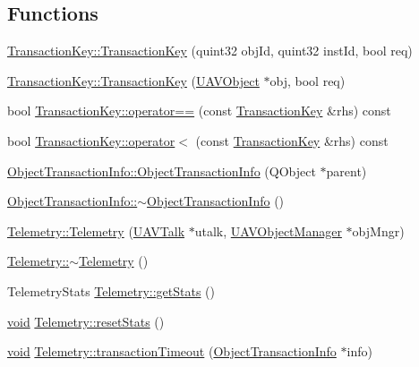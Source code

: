 \subsection*{\-Functions}
\begin{DoxyCompactItemize}
\item 
\hyperlink{group___u_a_v_talk_plugin_gad570ba59a89b2499d1fa950f756f029e}{\-Transaction\-Key\-::\-Transaction\-Key} (quint32 obj\-Id, quint32 inst\-Id, bool req)
\item 
\hyperlink{group___u_a_v_talk_plugin_ga01b3c8039cd97c7da26eb79fdeed0003}{\-Transaction\-Key\-::\-Transaction\-Key} (\hyperlink{class_u_a_v_object}{\-U\-A\-V\-Object} $\ast$obj, bool req)
\item 
bool \hyperlink{group___u_a_v_talk_plugin_ga6619fa90d68b631eef2b94302d77df19}{\-Transaction\-Key\-::operator==} (const \hyperlink{class_transaction_key}{\-Transaction\-Key} \&rhs) const 
\item 
bool \hyperlink{group___u_a_v_talk_plugin_ga535141f4efa21d7b4b5d5314c92d1c8e}{\-Transaction\-Key\-::operator$<$} (const \hyperlink{class_transaction_key}{\-Transaction\-Key} \&rhs) const 
\item 
\hyperlink{group___u_a_v_talk_plugin_ga56a113c31769c8841a65cf085c53a33e}{\-Object\-Transaction\-Info\-::\-Object\-Transaction\-Info} (\-Q\-Object $\ast$parent)
\item 
\hyperlink{group___u_a_v_talk_plugin_ga8b1a7a6e63feac107ca370ce1a68758f}{\-Object\-Transaction\-Info\-::$\sim$\-Object\-Transaction\-Info} ()
\item 
\hyperlink{group___u_a_v_talk_plugin_ga6998be3c493d7a742d8f54bcf235e823}{\-Telemetry\-::\-Telemetry} (\hyperlink{class_u_a_v_talk}{\-U\-A\-V\-Talk} $\ast$utalk, \hyperlink{class_u_a_v_object_manager}{\-U\-A\-V\-Object\-Manager} $\ast$obj\-Mngr)
\item 
\hyperlink{group___u_a_v_talk_plugin_ga5d74297211be2d8d48f38e2632c97de8}{\-Telemetry\-::$\sim$\-Telemetry} ()
\item 
\-Telemetry\-Stats \hyperlink{group___u_a_v_talk_plugin_ga9f456df92180138a0adebc5e3afc3402}{\-Telemetry\-::get\-Stats} ()
\item 
\hyperlink{group___u_a_v_objects_plugin_ga444cf2ff3f0ecbe028adce838d373f5c}{void} \hyperlink{group___u_a_v_talk_plugin_ga6452c56eab6e4b7ce913566562a005ef}{\-Telemetry\-::reset\-Stats} ()
\item 
\hyperlink{group___u_a_v_objects_plugin_ga444cf2ff3f0ecbe028adce838d373f5c}{void} \hyperlink{group___u_a_v_talk_plugin_gab5d172ba63e07316e086a65c5bcc8d47}{\-Telemetry\-::transaction\-Timeout} (\hyperlink{class_object_transaction_info}{\-Object\-Transaction\-Info} $\ast$info)

\end{DoxyCompactItemize}
